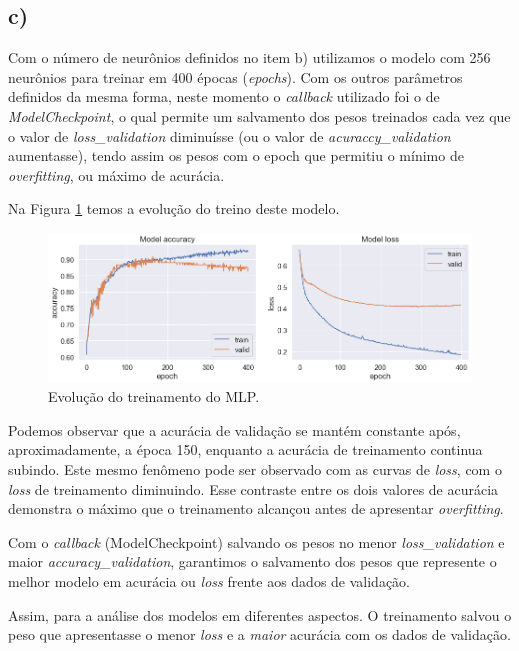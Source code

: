 \documentclass[12pt]{article}
\begin{document}
\subsection*{c)}

Com o número de neurônios definidos no item b) utilizamos o modelo com 256 neurônios para treinar em 400 épocas (\textit{epochs}). Com os outros parâmetros definidos da mesma forma, neste momento o \textit{callback} utilizado foi o de \textit{ModelCheckpoint}, o qual permite um salvamento dos pesos treinados cada vez que o valor de \textit{loss\_validation} diminuísse (ou o valor de \textit{acuraccy\_validation} aumentasse), tendo assim os pesos com o epoch que permitiu o mínimo de \textit{overfitting}, ou máximo de acurácia.

Na Figura \ref{fig:acc_evolution_loss} temos a evolução do treino deste modelo.
\begin{figure}[H]
	\centering
	\includegraphics[width=\linewidth]{Imagens/acc_evolution_loss.png}
	\caption{Evolução do treinamento do MLP.}
	\label{fig:acc_evolution_loss}
\end{figure}

Podemos observar que a acurácia de validação se mantém constante após, aproximadamente, a época 150, enquanto a acurácia de treinamento continua subindo. Este mesmo fenômeno pode ser observado com as curvas de \textit{loss}, com o \textit{loss} de treinamento diminuindo. Esse contraste entre os dois valores de acurácia demonstra o máximo que o treinamento alcançou antes de apresentar \textit{overfitting}.

Com o \textit{callback} (ModelCheckpoint) salvando os pesos no menor \textit{loss\_validation} e maior \textit{accuracy\_validation}, garantimos o salvamento dos pesos que represente o melhor modelo em acurácia ou \textit{loss} frente aos dados de validação. 

Assim, para a análise dos modelos em diferentes aspectos. O treinamento salvou o peso que apresentasse o menor \textit{loss} e a \textit{maior} acurácia com os dados de validação.
\end{document}
